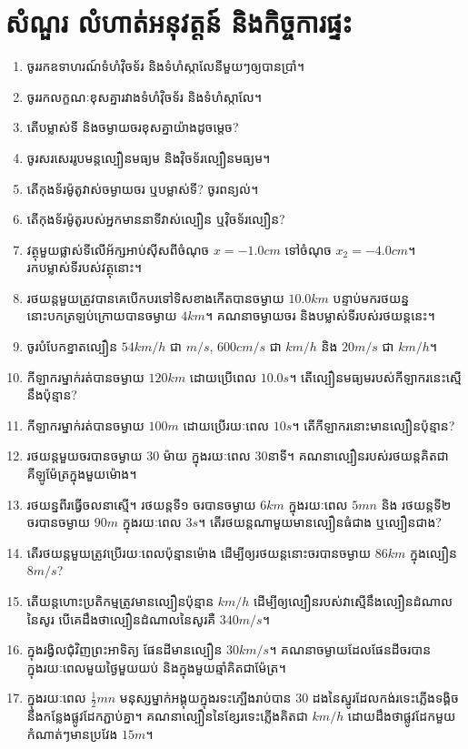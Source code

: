 \section{សំណួរ លំហាត់អនុវត្តន៍ និងកិច្ចការផ្ទះ}
\begin{enumerate}
	\item ចូររកឧទាហរណ៍ទំហំវ៉ិចទ័រ និងទំហំស្កាលែនីមួយៗឲ្យបានប្រាំ។
	\item ចូររកលក្ខណៈខុសគ្នារវាងទំហំវ៉ិចទ័រ និងទំហំស្កាលែ។
	\item តើបម្លាស់ទី និងចម្ងាយចរខុសគ្នាយ៉ាងដូចម្តេច?
	\item ចូរសរសេររូបមន្តល្បឿនមធ្យម និងវ៉ិចទ័រល្បឿនមធ្យម។
	\item តើកុងទ័រម៉ូតូវាស់ចម្ងាយចរ ឬបម្លាស់ទី? ចូរពន្យល់។
	\item តើកុងទ័រម៉ូតូរបស់អ្នកមាននាទីវាស់ល្បឿន ឬវ៉ិចទ័រល្បឿន?
	\item វត្ថុមួយផ្លាស់ទីលើអ័ក្សអាប់ស៊ីសពីចំណុច $x=-1.0cm$ ទៅចំណុច $x_{2}=-4.0cm$។ រកបម្លាស់ទីរបស់វត្ថុនោះ។
	\item រថយន្តមួយត្រូវបានគេបើកបរទៅទិសខាងកើតបានចម្ងាយ $10.0km$ បន្ទាប់មករថយន្ននោះបកត្រឡប់ក្រោយបានចម្ងាយ $4km$។ គណនាចម្ងាយចរ និងបម្លាស់ទីរបស់រថយន្តនេះ។
	\item ចូរបំបែកខ្នាតល្បឿន $54km/h$ ជា $m/s$, $600cm/s$ ជា $km/h$ និង $20m/s$ ជា $km/h$។ 
	\item កីឡាករម្នាក់រត់បានចម្ងាយ $120km$ ដោយប្រើពេល $10.0s$។ តើល្បឿនមធ្យមរបស់កីឡាករនេះស្មើនឹងប៉ុន្មាន?
	\item កីឡាករម្នាក់រត់បានចម្ងាយ $100m$ ដោយប្រើរយៈពេល $10s$។ តើកីឡាករនោះមានល្បឿនប៉ុន្មាន?
	\item រថយន្តមួយចរបានចម្ងាយ $30$ ម៉ាយ ក្នុងរយៈពេល $30$នាទី។ គណនាល្បឿនរបស់រថយន្តគិតជាគីឡូម៉ែត្រក្នុងមួយម៉ោង។
	\item រថយន្នពីរធ្វើចលនាស្មើ។ រថយន្តទី១ ចរបានចម្ងាយ $6km$ ក្នុងរយៈពេល $5mn$ និង រថយន្តទី២ ចរបានចម្ងាយ $90m$ ក្នុងរយៈពេល $3s$។ តើរថយន្តណាមួយមានល្បឿនធំជាង ឬល្បឿនជាង?
	\item តើរថយន្តមួយត្រូវប្រើរយៈពេលប៉ុន្មានម៉ោង ដើម្បីឲ្យរថយន្តនោះចរបានចម្ងាយ $86km$ ក្នុងល្បឿន $8m/s$?
	\item តើយន្តហោះប្រតិកម្មត្រូវមានល្បឿនប៉ុន្មាន $km/h$ ដើម្បីឲ្យល្បឿនរបស់វាស្មើនឹងល្បឿនដំណាលនៃសូរ បើគេដឹងថាល្បឿនដំណាលនៃសូរគឺ $340m/s$។
	\item ក្នុងរង្វិលជុំវិញព្រះអាទិត្យ ផែនដីមានល្បឿន $30km/s$។ គណនាចម្ងាយដែលផែនដីចរបានក្នុងរយៈពេលមួយថ្ងៃមួយយប់ និងក្នុងមួយឆ្មាំគិតជាម៉ែត្រ។
	\item ក្នុងរយៈពេល $\frac{1}{2}mn$ មនុស្សម្នាក់អង្គុយក្នុងរទះភ្ឡើងរាប់បាន $30$ ដងនៃស្នូរដែលកង់រទេះភ្លើងទង្គិចនឹងកន្លែងផ្លូវដែកភ្ជាប់គ្នា។ គណនាល្បឿននៃខ្សែរទេះភ្លើងគិតជា $km/h$ ដោយដឹងថាផ្លូវដែកមួយកំណាត់ៗមានប្រវែង $15m$។

\end{enumerate}
